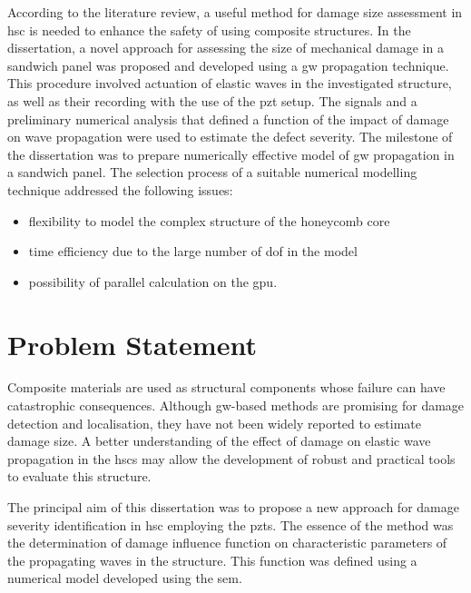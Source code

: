 \documentclass[11pt,a4paper,final]{report}
\theoremstyle{plain}
\begin{document}
According to the literature review, a useful method for damage size assessment in \ac{hsc} is needed to enhance the safety of using composite structures.
In the dissertation, a novel approach for assessing the size of mechanical damage in a sandwich panel was proposed and developed using a \ac{gw} propagation technique.
This procedure involved actuation of elastic waves in the investigated structure, as well as their recording with the use of the \ac{pzt} setup.
The signals and a preliminary numerical analysis that defined a function of the impact of damage on wave propagation were used to estimate the defect severity.
The milestone of the dissertation was to prepare numerically effective model of \ac{gw} propagation in a sandwich panel.
The selection process of a suitable numerical modelling technique addressed the following issues:
\begin{itemize}
	\item flexibility to model the complex structure of the honeycomb core
	\item time efficiency due to the large number of \ac{dof} in the model
	\item possibility of parallel calculation on the \ac{gpu}.
\end{itemize}\clearpage{}
\clearpage{}



\chapter[Problem Statement]{Problem Statement}
\label{ch:problem}





Composite materials are used as structural components whose failure can have catastrophic consequences.
Although \ac{gw}-based methods are promising for damage detection and localisation, they have not been widely reported to estimate damage size.
A better understanding of the effect of damage on elastic wave propagation in the \acp{hsc} may allow the development of robust and practical tools to evaluate this structure.

The principal aim of this dissertation was to propose a new approach for damage severity identification in \ac{hsc} employing the \acp{pzt}.
The essence of the method was the determination of damage influence function on characteristic parameters of the propagating waves in the structure.
This function was defined using a numerical model developed using the \ac{sem}.
\end{document}

